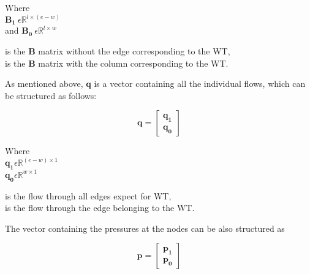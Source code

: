\begin{minipage}[t]{0.18\textwidth}
Where\\
\hspace*{8mm} $\pmb{B_1} \: \epsilon \mathbb{R}^{l \times (e-w)}$  \\
and \hspace*{0.4mm} $\pmb{B_0} \: \epsilon \mathbb{R}^{l \times w} $ 
\end{minipage}
\begin{minipage}[t]{0.70\textwidth}
\vspace*{2mm}
\hspace*{4mm} is the $\pmb{B}$ matrix without the edge corresponding to the WT,\\
\hspace*{4mm} is the $\pmb{B}$ matrix with the column corresponding to the WT.
\end{minipage}

As mentioned above, $\pmb{q}$ is a vector containing all the individual flows, which can be structured as follows:

\begin{equation}
\pmb{q} =
\begin{bmatrix}
         \pmb{q_1} \\
	\pmb{q_0} 
\end{bmatrix}
\label{qmatrix}
\end{equation}

\begin{minipage}[t]{0.20\textwidth}
Where\\
\hspace*{8mm} $\pmb{q_1} \epsilon \mathbb{R}^{(e-w) \times 1}$  \\
\hspace*{8mm} $\pmb{q_0} \epsilon \mathbb{R}^{w \times 1} $ 
\end{minipage}
\begin{minipage}[t]{0.68\textwidth}
\vspace*{2mm}
\hspace*{4mm} is the flow through all edges expect for WT,\\
\hspace*{4mm} is the flow through the edge belonging to the WT. 
\end{minipage}

The vector containing the pressures at the nodes can be also structured as

\begin{equation}
\pmb{p} =
\begin{bmatrix}
         \pmb{p_1} \\
	\pmb{p_0} 
\end{bmatrix}
\end{equation}

